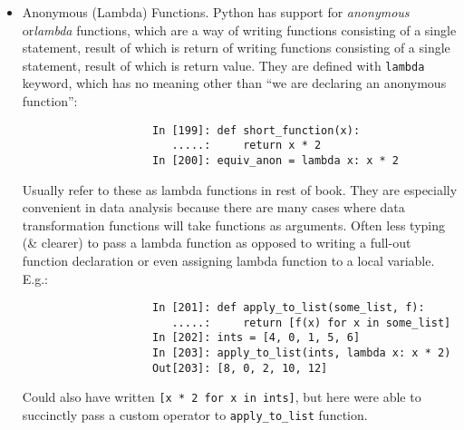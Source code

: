 \documentclass{article}
\begin{document}
\begin{enumerate}
\begin{itemize}
\begin{itemize}
\begin{itemize}
\begin{verbatim}
					clean_ops = [str.strip, remove_punctuation, str.title]
					
					def clean_strings(strings, ops):
					    result = []
					    for value in strings:
					        for func in ops:
					            value = func(value)
					        result.append(value)
					    return result
				\end{verbatim}
				Then have following:
				\begin{verbatim}
					In [197]: clean_strings(states, clean_ops)
					Out[197]:
					['Alabama',
					 'Georgia',
					 'Georgia',
					 'Georgia',
					 'Florida',
					 'South   Carolina',
					 'West Virginia']
				\end{verbatim}
				A more {\it functional} pattern like this enables you to easily modify how strings are transformed at a very high level. \verb|clean_strings| function is also now more reusable \& generic.
				
				Can use functions as arguments to other functions like built-in {\tt map} function, which applies a function to a sequence of some kind:
				\begin{verbatim}
					In [198]: for x in map(remove_punctuation, states):
					   .....:     print(x)
					Alabama
					Georgia
					Georgia
					georgia
					FlOrIda
					south   carolina
					West virginia
				\end{verbatim}
				{\tt map} can be used as an alternative to list comprehensions without any filter.
				\item {\sf Anonymous (Lambda) Functions.} Python has support for {\it anonymous} or{\it lambda} functions, which are a way of writing functions consisting of a single statement, result of which is return of writing functions consisting of a single statement, result of which is return value. They are defined with {\tt lambda} keyword, which has no meaning other than ``we are declaring an anonymous function'':
				\begin{verbatim}
					In [199]: def short_function(x):
					   .....:     return x * 2
					In [200]: equiv_anon = lambda x: x * 2
				\end{verbatim}
				Usually refer to these as lambda functions in rest of book. They are especially convenient in data analysis because there are many cases where data transformation functions will take functions as arguments. Often less typing (\& clearer) to pass a lambda function as opposed to writing a full-out function declaration or even assigning lambda function to a local variable. E.g.:
				\begin{verbatim}
					In [201]: def apply_to_list(some_list, f):
					   .....:     return [f(x) for x in some_list]
					In [202]: ints = [4, 0, 1, 5, 6]
					In [203]: apply_to_list(ints, lambda x: x * 2)
					Out[203]: [8, 0, 2, 10, 12]
				\end{verbatim}
				Could also have written {\tt [x * 2 for x in ints]}, but here were able to succinctly pass a custom operator to \verb|apply_to_list| function.
				

\end{itemize}
\end{itemize}
\end{itemize}
\end{enumerate}
\end{document}
